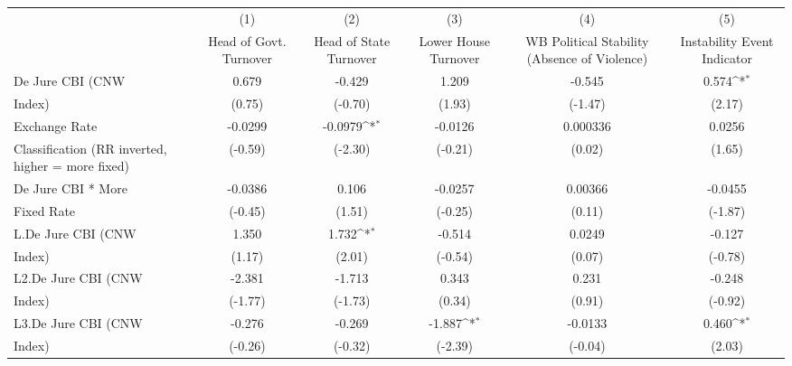 {
\def\sym#1{\ifmmode^{#1}\else\(^{#1}\)\fi}
\begin{tabular}{l*{5}{c}}
\hline\hline
                    &\multicolumn{1}{c}{(1)}&\multicolumn{1}{c}{(2)}&\multicolumn{1}{c}{(3)}&\multicolumn{1}{c}{(4)}&\multicolumn{1}{c}{(5)}\\
                    &\multicolumn{1}{c}{Head of Govt. Turnover}&\multicolumn{1}{c}{Head of State Turnover}&\multicolumn{1}{c}{Lower House Turnover}&\multicolumn{1}{c}{WB Political Stability (Absence of Violence)}&\multicolumn{1}{c}{Instability Event Indicator}\\
\hline
De Jure CBI (CNW    &       0.679         &      -0.429         &       1.209         &      -0.545         &       0.574\sym{*}  \\
Index)              &      (0.75)         &     (-0.70)         &      (1.93)         &     (-1.47)         &      (2.17)         \\
[1em]
Exchange Rate       &     -0.0299         &     -0.0979\sym{*}  &     -0.0126         &    0.000336         &      0.0256         \\
Classification (RR inverted, higher = more fixed)&     (-0.59)         &     (-2.30)         &     (-0.21)         &      (0.02)         &      (1.65)         \\
[1em]
De Jure CBI * More  &     -0.0386         &       0.106         &     -0.0257         &     0.00366         &     -0.0455         \\
Fixed Rate          &     (-0.45)         &      (1.51)         &     (-0.25)         &      (0.11)         &     (-1.87)         \\
[1em]
L.De Jure CBI (CNW  &       1.350         &       1.732\sym{*}  &      -0.514         &      0.0249         &      -0.127         \\
Index)              &      (1.17)         &      (2.01)         &     (-0.54)         &      (0.07)         &     (-0.78)         \\
[1em]
L2.De Jure CBI (CNW &      -2.381         &      -1.713         &       0.343         &       0.231         &      -0.248         \\
Index)              &     (-1.77)         &     (-1.73)         &      (0.34)         &      (0.91)         &     (-0.92)         \\
[1em]
L3.De Jure CBI (CNW &      -0.276         &      -0.269         &      -1.887\sym{*}  &     -0.0133         &       0.460\sym{*}  \\
Index)              &     (-0.26)         &     (-0.32)         &     (-2.39)         &     (-0.04)         &      (2.03)         \\

\end{tabular}}
